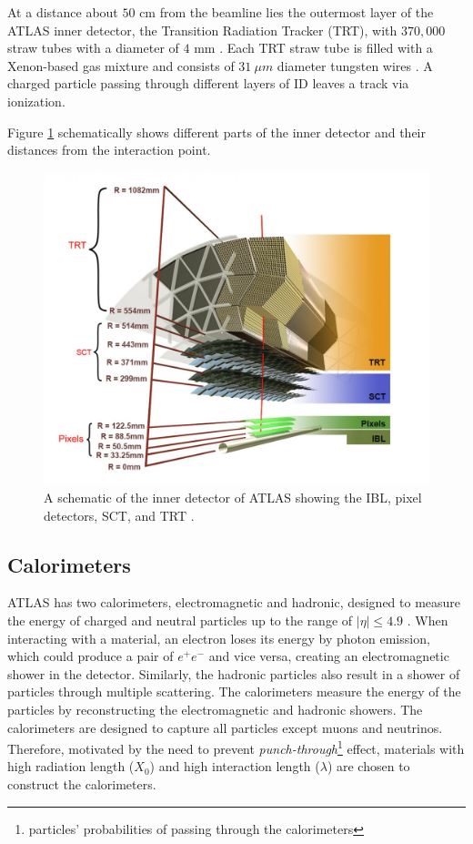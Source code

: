 At a distance about $50$ cm from the beamline lies the outermost layer of the ATLAS inner detector, the Transition Radiation Tracker (TRT), with $370,000$ straw tubes with a diameter of $4$ mm \cite{ID_TRT}. Each TRT straw tube is filled with a Xenon-based gas mixture and consists of $31~\mu m$ diameter tungsten wires \cite{ID_TRT}. A charged particle passing through different layers of ID leaves a track via ionization. 

Figure \ref{fig:ATLAS_ID} schematically shows different parts of the inner detector and their distances from the interaction point.

\begin{figure}
    \centering
    \includegraphics[width=.98\linewidth]{figures/LHC/ATLAS_InnerDetector.jpg}
    \caption{ A schematic of the inner detector of ATLAS showing the IBL, pixel detectors, SCT, and TRT \cite{ID_Align_Run2}.\label{fig:ATLAS_ID}}
\end{figure}

\subsection{Calorimeters}
\label{subsec:Cal}

ATLAS has two calorimeters, electromagnetic and hadronic, designed to measure the energy of charged and neutral particles up to the range of $|\eta|\leq4.9$ \cite{ATLAS}. When interacting with a material, an electron loses its energy by photon emission, which could produce a pair of $e^{+}e^{-}$ and vice versa, creating an electromagnetic shower in the detector. Similarly, the hadronic particles also result in a shower of particles through multiple scattering. The calorimeters measure the energy of the particles by reconstructing the electromagnetic and hadronic showers. The calorimeters are designed to capture all particles except muons and neutrinos. Therefore, motivated by the need to prevent \textit{punch-through}\footnote{particles' probabilities of passing through the calorimeters} effect, materials with high radiation length ($X_{0}$) and high interaction length ($\lambda$) are chosen to construct the calorimeters.

